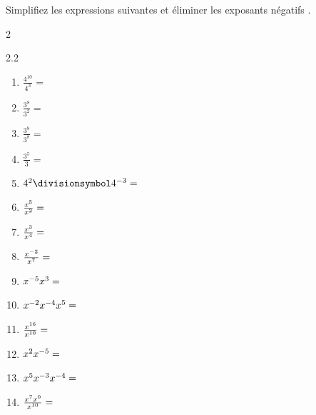 \documentclass[main.tex]{subfiles}
\begin{document}
\begin{exercise}[\cancel{\faCalculator}] Simplifiez les expressions suivantes et éliminer les exposants négatifs .\hfill \vspace{-1.0em}
	\begin{multicols}{2}
		\begin{spacing}{2.2}
			\begin{enumerate}[label={}, leftmargin=*]
				\item $\frac{4^{10}}{4^{3}}=$\dotfill  
				\item $\frac{3^{8}}{3^{2}}=$\dotfill 
				\item $\frac{3^{8}}{3^{8}}=$\dotfill 
				\item $\frac{3^5}{3}=$\dotfill 
				\item $4^{2}\divisionsymbol 4^{-3}=$\dotfill 
				\item $\frac{x^5}{x^2}=\dotfill$
				\item $\frac{x^3}{x^4}=\dotfill$
				\item $\frac{x^{-2}}{x^7}=\dotfill$
				\item $x^{-5}x^3=\dotfill$
				\item $x^{-2}x^{-4}x^5=\dotfill $
				\item $\frac{x^{16}}{x^{10}}=\dotfill$
				\item $x^2x^{-5}=\dotfill $
				\item $x^5x^{-3}x^{-4}=\dotfill $
				\item $\frac{x^7x^0}{x^{10}}=\dotfill $
			\end{enumerate}
		\end{spacing}\vspace{-0.5em}
	\end{multicols} 
\end{exercise} 
\end{document}
